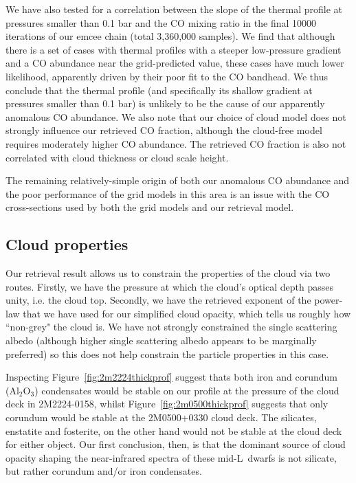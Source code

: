 \documentclass[useAMS,usenatbib]{mn2e}
\begin{document}
We have also tested for a correlation between the slope of the thermal profile at pressures smaller than 0.1 bar and the CO mixing ratio in the final 10000 iterations of our {\sc emcee} chain (total 3,360,000 samples). We find that although there is a set of cases with thermal profiles with a steeper low-pressure gradient and a CO abundance near the grid-predicted value, these cases have much lower likelihood, apparently driven by their poor fit to the CO bandhead. We thus conclude that the thermal profile (and specifically its shallow gradient at pressures smaller than 0.1 bar) is unlikely to be the cause of our apparently anomalous CO abundance. We also note that our choice of cloud model does not strongly influence our retrieved CO fraction, although the cloud-free model requires moderately higher CO abundance. The retrieved CO fraction is also not correlated with cloud thickness or cloud scale height.

 The remaining relatively-simple origin of both our anomalous CO abundance and the poor performance of the grid models in this area is an issue with the CO cross-sections used by both the grid models and our retrieval model.  







\subsection{Cloud properties}
\label{subsec:cloudret}

Our retrieval result allows us to constrain the properties of the cloud via two routes. Firstly, we have the pressure at which the cloud's optical depth passes unity, i.e. the cloud top. Secondly, we have the retrieved exponent of the power-law that we have used for our simplified cloud opacity, which tells us roughly how ``non-grey" the cloud is. We have not strongly constrained the single scattering albedo (although higher single scattering albedo appears to be marginally preferred) so this does not help constrain the particle properties in this case. 


Inspecting Figure~\ref{fig:2m2224thickprof} suggest thats both iron and corundum (Al$_{2}$O$_{3}$) condensates would be stable on our profile at the pressure of the cloud deck in 2M2224-0158, whilst Figure~\ref{fig:2m0500thickprof} suggests that only corundum would be stable at the 2M0500+0330 cloud deck. The silicates, enstatite and fosterite, on the other hand would not be stable at the cloud deck for either object. Our first conclusion, then, is that the dominant source of cloud opacity shaping the near-infrared spectra of these mid-L~dwarfs  is not silicate, but rather corundum and/or iron condensates.  
\end{document}
